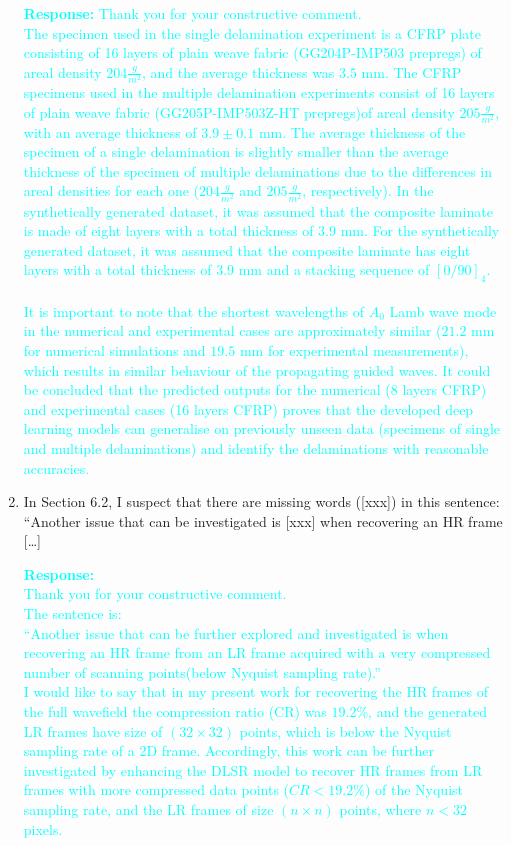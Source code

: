 \documentclass[11pt,a2paper]{report}
\begin{document}
\begin{enumerate}
		\textcolor{Cyan}{
			\textbf{Response:}
			Thank you for your constructive comment. \\
			The specimen used in the single delamination experiment is a CFRP plate consisting of 16 layers of plain weave fabric (GG204P-IMP503 prepregs) of areal density \(204\frac{g}{m^2}\), and the average thickness was \(3.5\) mm.
			The CFRP specimens used in the multiple delamination experiments consist of 16 layers of plain weave fabric (GG205P-IMP503Z-HT prepregs)of areal density \(205\frac{g}{m^2}\), with an average thickness of \(3.9 \pm 0.1\) mm. 
			The average thickness of the specimen of a single delamination is slightly smaller than the average thickness of the specimen of multiple delaminations due to the differences in areal densities for each one (\(204\frac{g}{m^2}\) and \(205\frac{g}{m^2}\), respectively).
			In the synthetically generated dataset, it was assumed that the composite laminate is made of eight layers with a total thickness of 3.9 mm.
			For the synthetically generated dataset, it was assumed that the composite laminate has eight layers with a total thickness of 3.9 mm and a stacking sequence of \([0/90]_4\).		
			\\ \\	
			It is important to note that the shortest wavelengths of \(A_0\) Lamb wave mode in the numerical and experimental cases are approximately similar (\(21.2\) mm for numerical simulations and \(19.5\) mm for experimental measurements), which results in similar behaviour of the propagating guided waves.
			It could be concluded that the predicted outputs for the numerical (8 layers CFRP) and experimental cases (16 layers CFRP) proves that the developed deep learning models can generalise on previously unseen data (specimens of single and multiple delaminations) and identify the delaminations with reasonable accuracies.
		}	
		
		\item In Section 6.2, I suspect that there are missing words ([xxx]) in this sentence: “Another
		issue that can be investigated is [xxx] when recovering an HR frame […]
		
		\textcolor{Cyan}{
			\textbf{Response:} \\
			 Thank you for your constructive comment. \\
			 The sentence is:\\
			 \enquote{Another issue that can be further explored and investigated is when recovering an HR frame from an LR frame acquired with a very compressed number of scanning points(below Nyquist sampling rate).}
			 \\
			 I would like to say that in my present work for recovering the HR frames of the full wavefield the compression ratio (CR) was $19.2\%$, and the generated LR frames have size of \((32\times32)\) points, which is below the Nyquist sampling rate of a 2D frame.
			 Accordingly, this work can be further investigated by enhancing the DLSR model to recover HR frames from LR frames with more compressed data points ($CR<19.2\%$) of the Nyquist sampling rate, and the LR frames of size \((n\times n)\) points, where \(n <32\) pixels.
		 }
		\end{enumerate}
\end{document}
